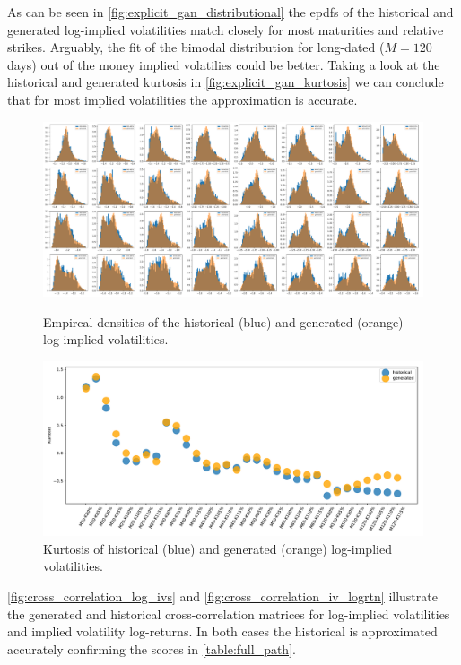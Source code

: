 \documentclass[]{article} %
\begin{document}
As can be seen in \autoref{fig:explicit_gan_distributional} the epdfs of the historical and generated log-implied volatilities match closely for most maturities and relative strikes. Arguably, the fit of the bimodal distribution for long-dated ($M=120$ days) out of the money implied volatilies could be better. Taking a look at the historical and generated kurtosis in \autoref{fig:explicit_gan_kurtosis} we can conclude that for most implied volatilities the approximation is accurate. 
\begin{figure}[!htb]
\begin{minipage}{.45\textwidth}
\centering
\includegraphics[width=\textwidth]{figures/imp_vol/plot/distributional.pdf}
\caption{Empircal densities of the historical (blue) and generated (orange) log-implied volatilities.}
\label{fig:explicit_gan_distributional}
\end{minipage}%
	\hfill
\begin{minipage}{.45\textwidth}
\centering
\includegraphics[width=\textwidth]{figures/imp_vol/plot/kurtosis.pdf}
\caption{Kurtosis of historical (blue) and generated (orange) log-implied volatilities.}
\label{fig:explicit_gan_kurtosis}
\end{minipage}
\end{figure}

\autoref{fig:cross_correlation_log_ivs} and \autoref{fig:cross_correlation_iv_logrtn} illustrate the generated and historical cross-correlation matrices for log-implied volatilities and implied volatility log-returns. In both cases the historical is approximated accurately confirming the scores in \autoref{table:full_path}.
\end{document}
